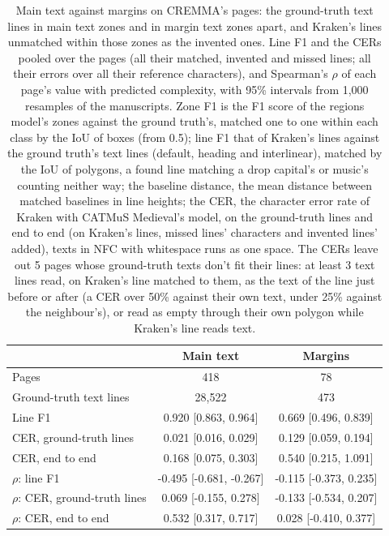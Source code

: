 \begin{table}[htbp]
  \centering
  \caption{Main text against margins on CREMMA's pages: the ground-truth text lines in main text zones and in margin text zones apart, and Kraken's lines unmatched within those zones as the invented ones. Line F1 and the CERs pooled over the pages (all their matched, invented and missed lines; all their errors over all their reference characters), and Spearman's $\rho$ of each page's value with predicted complexity, with 95\% intervals from 1,000 resamples of the manuscripts. Zone F1 is the F1 score of the regions model's zones against the ground truth's, matched one to one within each class by the IoU of boxes (from 0.5); line F1 that of Kraken's lines against the ground truth's text lines (default, heading and interlinear), matched by the IoU of polygons, a found line matching a drop capital's or music's counting neither way; the baseline distance, the mean distance between matched baselines in line heights; the CER, the character error rate of Kraken with CATMuS Medieval's model, on the ground-truth lines and end to end (on Kraken's lines, missed lines' characters and invented lines' added), texts in NFC with whitespace runs as one space. The CERs leave out 5 pages whose ground-truth texts don't fit their lines: at least 3 text lines read, on Kraken's line matched to them, as the text of the line just before or after (a CER over 50\% against their own text, under 25\% against the neighbour's), or read as empty through their own polygon while Kraken's line reads text.}
  \label{tab:difficulty_main_text_and_margins}
  \begin{tabular}{lcc}
    \toprule
     & Main text & Margins \\
    \midrule
    Pages & 418 & 78 \\
    Ground-truth text lines & 28,522 & 473 \\
    \midrule
    Line F1 & 0.920 [0.863, 0.964] & 0.669 [0.496, 0.839] \\
    CER, ground-truth lines & 0.021 [0.016, 0.029] & 0.129 [0.059, 0.194] \\
    CER, end to end & 0.168 [0.075, 0.303] & 0.540 [0.215, 1.091] \\
    \midrule
    $\rho$: line F1 & -0.495 [-0.681, -0.267] & -0.115 [-0.373, 0.235] \\
    $\rho$: CER, ground-truth lines & 0.069 [-0.155, 0.278] & -0.133 [-0.534, 0.207] \\
    $\rho$: CER, end to end & 0.532 [0.317, 0.717] & 0.028 [-0.410, 0.377] \\
    \bottomrule
  \end{tabular}
\end{table}
